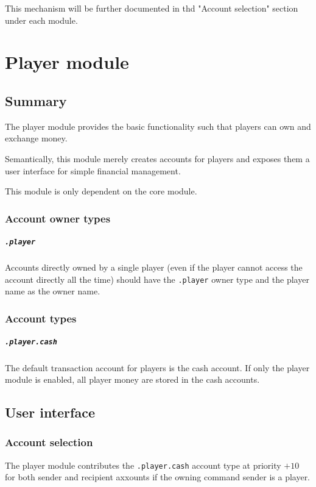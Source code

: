 \documentclass{report}
\begin{document}
				This mechanism will be further documented in thd "Account selection" section under each module.

	\chapter{Player module}
		\section{Summary}

			The player module provides the basic functionality such that players can own and exchange money.

			Semantically, this module merely creates accounts for players and exposes them a user interface for simple financial management.

			This module is only dependent on the core module.

			\subsection{Account owner types}
				\paragraph{\texttt{.player}}
					Accounts directly owned by a single player (even if the player cannot access the account directly all the time)
					should have the \texttt{.player} owner type and the player name as the owner name.

			\subsection{Account types}
				\paragraph{\texttt{.player.cash}}
					The default transaction account for players is the cash account.
					If only the player module is enabled, all player money are stored in the cash accounts.

		\section{User interface}
			\subsection{Account selection}
				The player module contributes the \texttt{.player.cash} account type at priority $+10$
				for both sender and recipient axxounts if the owning command sender is a player.
\end{document}
